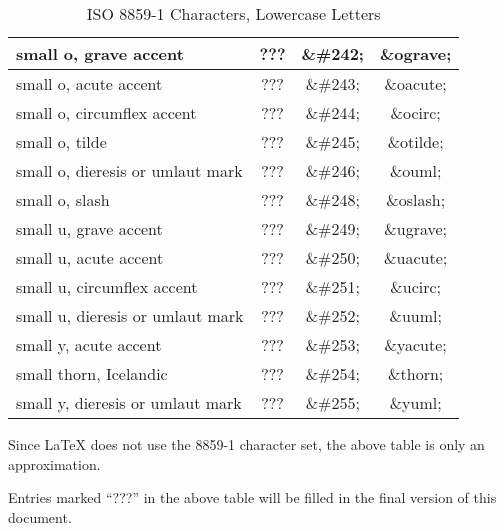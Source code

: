 \begin{table}[htbp]
\begin{center}
\begin{tabular}{lc>{\ttfamily}c>{\ttfamily}c}
      small o, grave accent               & ??? & \&\#242; & \&ograve; \\
      \hline
      small o, acute accent               & ??? & \&\#243; & \&oacute; \\
      small o, circumflex accent          & ??? & \&\#244; & \&ocirc; \\
      small o, tilde                      & ??? & \&\#245; & \&otilde; \\
      small o, dieresis or umlaut mark    & ??? & \&\#246; & \&ouml; \\
      \hline
      small o, slash                      & ??? & \&\#248; & \&oslash; \\
      small u, grave accent               & ??? & \&\#249; & \&ugrave; \\
      small u, acute accent               & ??? & \&\#250; & \&uacute; \\
      small u, circumflex accent          & ??? & \&\#251; & \&ucirc; \\
      \hline
      small u, dieresis or umlaut mark    & ??? & \&\#252; & \&uuml; \\
      small y, acute accent               & ??? & \&\#253; & \&yacute; \\
      small thorn, Icelandic              & ??? & \&\#254; & \&thorn; \\
      small y, dieresis or umlaut mark    & ??? & \&\#255; & \&yuml; \\
    \end{tabular}
    \caption{ISO 8859-1 Characters, Lowercase Letters}
    \label{t:ISO8859-1:lowercase}
  \end{center}
\end{table}


\begin{notes}
  \item Since LaTeX does not use the 8859-1 character set, the
  above table is only an approximation.
  \item Entries marked ``???'' in the above table will be filled
  in the final version of this document.
\end{notes}


